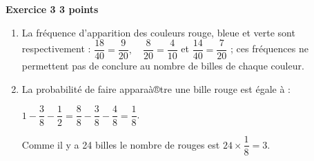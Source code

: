 \textbf{Exercice 3 \hfill 3 points}

\bigskip 

\begin{enumerate}
\item 

% 
%
% 
La fréquence d'apparition des couleurs rouge, bleue et verte sont respectivement : $\dfrac{18}{40} = \dfrac{9}{20}, \quad \dfrac{8}{20} = \dfrac{4}{10}$ et $\dfrac{14}{40} = \dfrac{7}{20}$ ; ces fréquences ne permettent pas de conclure au nombre de billes de chaque couleur.
\item %

La probabilité de faire apparaà®tre une bille rouge est égale à  :

$1 - \dfrac{3}{8} - \dfrac{1}{2} = \dfrac{8}{8} - \dfrac{3}{8} - \dfrac{4}{8} = \dfrac{1}{8}$.

Comme il y a 24 billes le nombre de rouges est $24 \times \dfrac{1}{8} = 3$. 
\end{enumerate}

\bigskip
 
